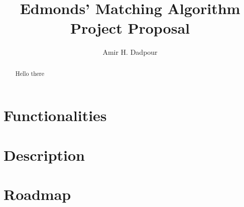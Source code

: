 \documentclass[acmsmall, screen, nonacm]{acmart}
\begin{document}
\title{Edmonds' Matching Algorithm Project Proposal}
\author{Amir H. Dadpour}


\begin{abstract}
	Hello there \cite{Edmonds1965}
\end{abstract}


\maketitle

\section{Functionalities}
\section{Description}
\section{Roadmap}


{}
\end{document}

